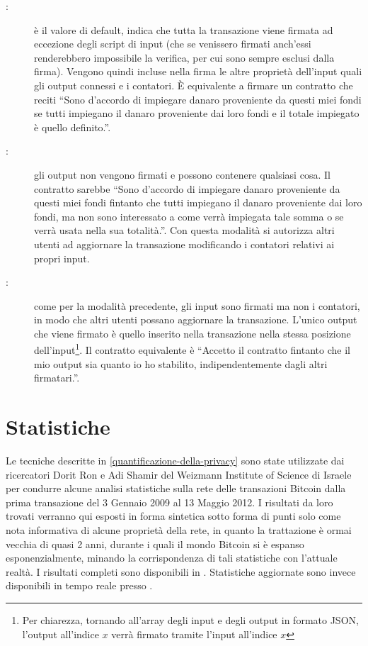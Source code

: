 \begin{description}
    \item[:] è il valore di default, indica che tutta la transazione viene firmata ad eccezione degli script di input (che se venissero firmati anch'essi renderebbero impossibile la verifica, per cui sono sempre esclusi dalla firma). Vengono quindi incluse nella firma le altre proprietà dell'input quali gli output connessi e i contatori. È equivalente a firmare un contratto che reciti ``Sono d'accordo di impiegare danaro proveniente da questi miei fondi se tutti impiegano il danaro proveniente dai loro fondi e il totale impiegato è quello definito.''.
    \item[:] gli output non vengono firmati e possono contenere qualsiasi cosa. Il contratto sarebbe ``Sono d'accordo di impiegare danaro proveniente da questi miei fondi fintanto che tutti impiegano il danaro proveniente dai loro fondi, ma non sono interessato a come verrà impiegata tale somma o se verrà usata nella sua totalità.''. Con questa modalità si autorizza altri utenti ad aggiornare la transazione modificando i contatori relativi ai propri input.
    \item[:] come per la modalità precedente, gli input sono firmati ma non i contatori, in modo che altri utenti possano aggiornare la transazione. L'unico output che viene firmato è quello inserito nella transazione nella stessa posizione dell'input\footnote{Per chiarezza, tornando all'array degli input e degli output in formato JSON, l'output all'indice $x$ verrà firmato tramite l'input  all'indice $x$}. Il contratto equivalente è ``Accetto il contratto fintanto che il mio output sia quanto io ho stabilito, indipendentemente dagli altri firmatari.''.
\end{description}


\section{Statistiche}

Le tecniche descritte in \ref{quantificazione-della-privacy} sono state utilizzate dai ricercatori Dorit Ron e Adi Shamir del Weizmann Institute of Science di Israele per condurre alcune analisi statistiche sulla rete delle transazioni Bitcoin dalla prima transazione del 3 Gennaio 2009 al 13 Maggio 2012. I risultati da loro trovati verranno qui esposti in forma sintetica sotto forma di punti solo come nota informativa di alcune proprietà della rete, in quanto la trattazione è ormai vecchia di quasi 2 anni, durante i quali il mondo Bitcoin si è espanso esponenzialmente, minando la corrispondenza di tali statistiche con l'attuale realtà. I risultati completi sono disponibili in \cite{transazioni}. Statistiche aggiornate sono invece disponibili in tempo reale presso \cite{blockchain-info}.\\

